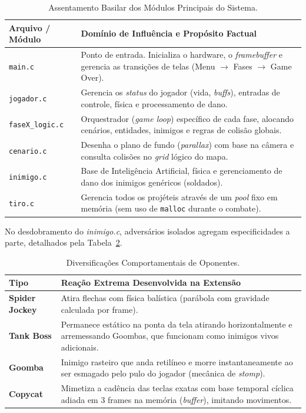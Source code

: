 \documentclass[10pt,twocolumn,letterpaper]{article}
\begin{document}
\begin{table}[H]
\centering
\caption{Assentamento Basilar dos Módulos Principais do Sistema.}
\label{tab:modulos}
\scriptsize
\begin{tabularx}{\columnwidth}{@{}lX@{}}
\toprule
\textbf{Arquivo / Módulo} & \textbf{Domínio de Influência e Propósito Factual} \\ \midrule
\texttt{main.c} & Ponto de entrada. Inicializa o hardware, o \textit{framebuffer} e gerencia as transições de telas (Menu $\to$ Fases $\to$ Game Over). \\
\texttt{jogador.c} & Gerencia os \textit{status} do jogador (vida, \textit{buffs}), entradas de controle, física e processamento de dano. \\
\texttt{faseX\_logic.c} & Orquestrador (\textit{game loop}) específico de cada fase, alocando cenários, entidades, inimigos e regras de colisão globais. \\
\texttt{cenario.c} & Desenha o plano de fundo (\textit{parallax}) com base na câmera e consulta colisões no \textit{grid} lógico do mapa. \\
\texttt{inimigo.c} & Base de Inteligência Artificial, física e gerenciamento de dano dos inimigos genéricos (soldados). \\
\texttt{tiro.c} & Gerencia todos os projéteis através de um \textit{pool} fixo em memória (sem uso de \texttt{malloc} durante o combate). \\ \bottomrule
\end{tabularx}
\end{table}

No desdobramento do \textit{inimigo.c}, adversários isolados agregam especificidades a parte, detalhados pela Tabela~\ref{tab:inimigos}.

\begin{table}[H]
\centering
\caption{Diversificações Comportamentais de Oponentes.}
\label{tab:inimigos}
\scriptsize
\begin{tabularx}{\columnwidth}{@{}lX@{}}
\toprule
\textbf{Tipo} & \textbf{Reação Extrema Desenvolvida na Extensão} \\ \midrule
\textbf{Spider Jockey} & Atira flechas com física balística (parábola com gravidade calculada por frame). \\
\textbf{Tank Boss} & Permanece estático na ponta da tela atirando horizontalmente e arremessando Goombas, que funcionam como inimigos vivos adicionais. \\
\textbf{Goomba} & Inimigo rasteiro que anda retilíneo e morre instantaneamente ao ser esmagado pelo pulo do jogador (mecânica de \textit{stomp}). \\
\textbf{Copycat} & Mimetiza a cadência das teclas exatas com base temporal cíclica adiada em 3 frames na memória (\textit{buffer}), imitando movimentos. \\ \bottomrule
\end{tabularx}
\end{table}
\end{document}
